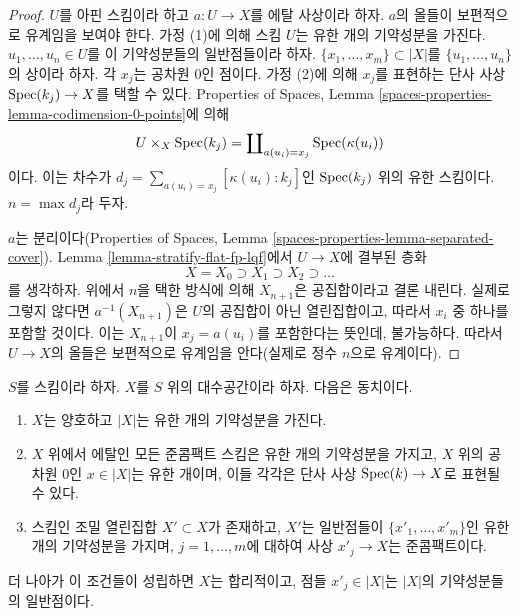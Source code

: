 \begin{proof}
$U$를 아핀 스킴이라 하고 $a : U \to X$를 에탈 사상이라 하자.
$a$의 올들이 보편적으로 유계임을 보여야 한다. 가정 (1)에 의해 스킴
$U$는 유한 개의 기약성분을 가진다. $u_1, \ldots, u_n \in U$를
이 기약성분들의 일반점들이라 하자.
$\{x_1, \ldots, x_m\} \subset |X|$를
$\{u_1, \ldots, u_n\}$의 상이라 하자. 각 $x_j$는 공차원 $0$인
점이다. 가정 (2)에 의해 $x_j$를 표현하는 단사 사상
$\mathop{\mathrm{Spec}}(k_j) \to X$를 택할 수 있다. Properties of Spaces, Lemma
\ref{spaces-properties-lemma-codimension-0-points}에 의해
$$
U \times_X \mathop{\mathrm{Spec}}(k_j) = \coprod\nolimits_{a(u_i) = x_j} \mathop{\mathrm{Spec}}(\kappa(u_i))
$$
이다. 이는 차수가
$d_j = \sum_{a(u_i) = x_j} [\kappa(u_i) : k_j]$인
$\mathop{\mathrm{Spec}}(k_j)$ 위의 유한 스킴이다. $n = \max d_j$라 두자.

\medskip\noindent
$a$는 분리이다(Properties of Spaces, Lemma
\ref{spaces-properties-lemma-separated-cover}).
Lemma \ref{lemma-stratify-flat-fp-lqf}에서 $U \to X$에 결부된 층화
$$
X = X_0 \supset X_1 \supset X_2 \supset \ldots
$$
를 생각하자. 위에서 $n$을 택한 방식에 의해 $X_{n + 1}$은 공집합이라고
결론 내린다. 실제로 그렇지 않다면 $a^{-1}(X_{n + 1})$은 $U$의
공집합이 아닌 열린집합이고, 따라서
$x_i$ 중 하나를 포함할 것이다. 이는 $X_{n + 1}$이
$x_j = a(u_i)$를 포함한다는 뜻인데, 불가능하다.
따라서 $U \to X$의 올들은 보편적으로 유계임을 안다(실제로 정수
$n$으로 유계이다).
\end{proof}

\begin{lemma}
\label{lemma-finitely-many-irreducible-components}
$S$를 스킴이라 하자. $X$를 $S$ 위의 대수공간이라 하자.
다음은 동치이다.
\begin{enumerate}
\item $X$는 양호하고 $|X|$는 유한 개의 기약성분을 가진다.
\item $X$ 위에서 에탈인 모든 준콤팩트 스킴은 유한 개의 기약성분을
가지고, $X$ 위의 공차원 $0$인 $x \in |X|$는 유한 개이며, 이들 각각은
단사 사상 $\mathop{\mathrm{Spec}}(k) \to X$로 표현될 수 있다.
\item 스킴인 조밀 열린집합 $X' \subset X$가 존재하고, $X'$는
일반점들이 $\{x'_1, \ldots, x'_m\}$인 유한 개의 기약성분을 가지며,
$j = 1, \ldots, m$에 대하여 사상 $x'_j \to X$는 준콤팩트이다.
\end{enumerate}
더 나아가 이 조건들이 성립하면 $X$는 합리적이고, 점들
$x'_j \in |X|$는 $|X|$의 기약성분들의 일반점이다.
\end{lemma}

